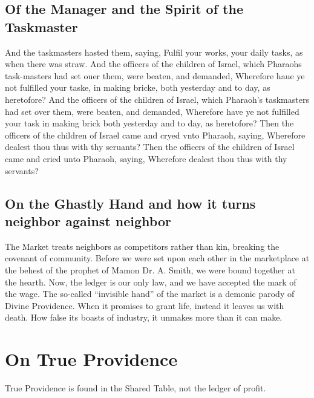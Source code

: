 \subsection{Of the Manager and the Spirit of the Taskmaster}
\begin{scripture}[Exod. 5:13--15]
    And the taskmasters hasted them, saying, Fulfil your works, your daily tasks, as when there was straw.
    And the officers of the children of Israel, which Pharaohs task-masters had set ouer them, were beaten, and demanded, Wherefore haue ye not fulfilled your taske, in making bricke, both yesterday and to day, as heretofore?
    And the officers of the children of Israel, which Pharaoh's taskmasters had set over them, were beaten, and demanded, Wherefore have ye not fulfilled your task in making brick both yesterday and to day, as heretofore?
    Then the officers of the children of Israel came and cryed vnto Pharaoh, saying, Wherefore dealest thou thus with thy seruants?
    Then the officers of the children of Israel came and cried unto Pharaoh, saying, Wherefore dealest thou thus with thy servants?
\end{scripture}


\subsection{On the Ghastly Hand and how it turns neighbor against neighbor}
The Market treats neighbors as competitors rather than kin, breaking the covenant of community.
Before we were set upon each other in the marketplace at the behest of the prophet of Mamon Dr. A. Smith, we were bound together at the hearth.
Now, the ledger is our only law, and we have accepted the mark of the wage.
The so-called ``invisible hand'' of the market is a demonic parody of Divine Providence.
When it promises to grant life, instead it leaves us with death.
How false its boasts of industry, it unmakes more than it can make.

\section{On True Providence}
True Providence is found in the Shared Table, not the ledger of profit.


